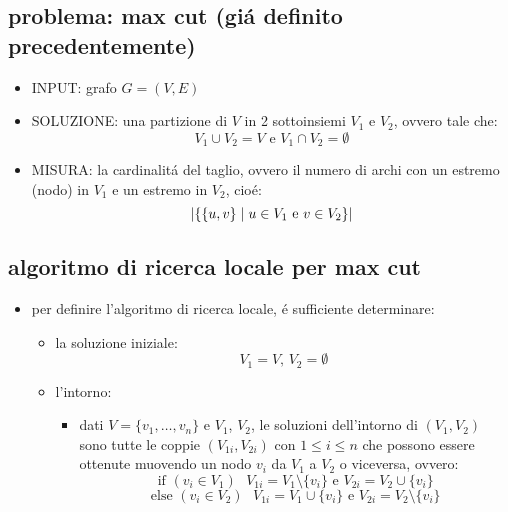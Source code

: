 \subsection*{problema: max cut (gi\'a definito precedentemente)}
\begin{flushleft}
	\begin{itemize}
		\item INPUT: grafo $G=(V,E)$
		\item SOLUZIONE: una partizione di $V$ in 2 sottoinsiemi $V_1$ e $V_2$, ovvero tale che:
			$$V_1\cup V_2=V\text{ e }V_1\cap V_2=\emptyset$$
		\item MISURA: la cardinalit\'a del taglio, ovvero il numero di archi con un estremo (nodo) in $V_1$ e un estremo in $V_2$, cio\'e:
			$$\vert\{\{u,v\}\hspace{0.1cm}\vert\hspace{0.1cm}u\in V_1\text{ e }v\in V_2\}\vert$$
	\end{itemize}
\end{flushleft}


\subsection*{algoritmo di ricerca locale per max cut}
\begin{flushleft}
	\begin{itemize}
		\item per definire l'algoritmo di ricerca locale, \'e sufficiente determinare:
		\begin{itemize}
			\item la soluzione iniziale:
				$$V_1=V\text{, }V_2=\emptyset$$
			\item l'intorno:
			\begin{itemize}
				\item dati $V=\{v_1,\ldots,v_n\}$ e $V_1$, $V_2$, le soluzioni dell'intorno di $(V_1,V_2)$ sono tutte le coppie $(V_{1i},V_{2i})$ con $1\leq i\leq n$ che possono essere ottenute muovendo un nodo $v_i$ da $V_1$ a $V_2$ o viceversa, ovvero:
					$$\text{if }(v_i\in V_1)\text{ }V_{1i}=V_1\setminus\{v_i\}\text{ e }V_{2i}=V_2\cup\{v_i\}$$
					$$\text{else }(v_i\in V_2)\text{ }V_{1i}=V_1\cup\{v_i\}\text{ e }V_{2i}=V_2\setminus\{v_i\}$$
			\end{itemize}
		\end{itemize}
	\end{itemize}
\end{flushleft}

